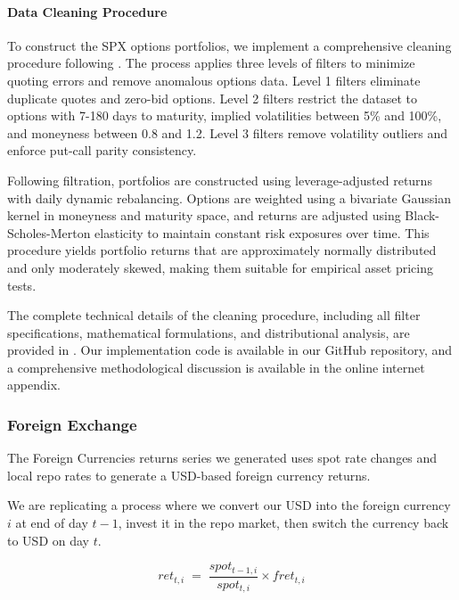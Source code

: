 \documentclass{article}
\begin{document}
\begin{appendices}
\paragraph{Data Cleaning Procedure}

To construct the SPX options portfolios, we implement a comprehensive cleaning procedure following \citet{Constantinides2013}. The process applies three levels of filters to minimize quoting errors and remove anomalous options data. Level 1 filters eliminate duplicate quotes and zero-bid options. Level 2 filters restrict the dataset to options with 7-180 days to maturity, implied volatilities between 5\% and 100\%, and moneyness between 0.8 and 1.2. Level 3 filters remove volatility outliers and enforce put-call parity consistency.

Following filtration, portfolios are constructed using leverage-adjusted returns with daily dynamic rebalancing. Options are weighted using a bivariate Gaussian kernel in moneyness and maturity space, and returns are adjusted using Black-Scholes-Merton elasticity to maintain constant risk exposures over time. This procedure yields portfolio returns that are approximately normally distributed and only moderately skewed, making them suitable for empirical asset pricing tests.

The complete technical details of the cleaning procedure, including all filter specifications, mathematical formulations, and distributional analysis, are provided in \citet{Constantinides2013}. Our implementation code is available in our GitHub repository, and a comprehensive methodological discussion is available in the online internet appendix.



\subsubsection{Foreign Exchange}
\label{sec:fx}
The Foreign Currencies returns series we generated uses spot rate changes and local repo rates to generate a USD-based
foreign currency returns. 

We are replicating a process where we convert our USD into the foreign currency $i$ at end of day $t - 1$, 
invest it in the repo market, then switch the currency back to USD on day $t$. 

\begin{equation}
  ret_{t, i} \;=\; \frac{spot_{t - 1, i}}{spot_{t, i}} \times fret_{t, i}
\end{equation}


\end{appendices}
\end{document}
